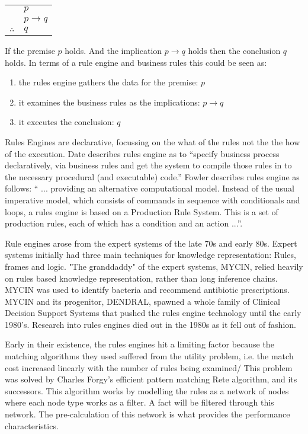 \begin{tabular}{c@{\,}l@{}} 
    & $p$ \\
\arrayrulecolor{blue!60!green!70}    & $p \to q$ \\\cline{2-2}
$\therefore$         & $q$ \\
\end{tabular}

If the premise $p$ holds. And the implication $p \to q$ holds then the conclusion $q$ holds. 
In terms of a rule engine and business rules this could be seen as:
\begin{enumerate}
    \item the rules engine gathers the data for the premise: $p$
    \item it examines the business rules as the implications: $p \to q$
    \item it executes the conclusion: $q$
\end{enumerate}


Rules Engines are declarative, focussing on the what of the rules not the the how of the execution.
Date\cite{date2000not} describes rules engine as to ``specify business process declaratively, via business rules and get the system to compile those rules in to the necessary procedural (and executable) code.''
Fowler\cite{Fowler_rulesEngine} describes rules engine as follows: `` ... providing an alternative computational model.
Instead of the usual imperative model, which consists of commands in sequence with conditionals and loops, a rules engine is based on a Production Rule System.
This is a set of production rules, each of which has a condition and an action ...''.

Rule engines arose from the expert systems of the late 70s and early 80s. 
Expert systems initially had three main techniques for knowledge representation: Rules, frames and logic\cite{jackson1986introduction}.  
"The granddaddy" of the expert systems, MYCIN, relied heavily on rules based knowledge representation\cite{shortliffe1974mycin}, rather than long inference chains.
MYCIN was used to identify bacteria and recommend antibiotic prescriptions.
MYCIN and its progenitor, DENDRAL, spawned a whole family of Clinical Decision Support Systems that pushed the rules engine technology until the early 1980's.
Research into rules engines died out in the 1980s as it fell out of fashion.

Early in their existence, the rules engines hit a limiting factor because the matching algorithms they used suffered from the utility problem, i.e. the match cost increased linearly with the number of rules being examined/
This problem was solved by Charles Forgy's efficient pattern matching Rete algorithm\cite{forgy1989rete}, and its successors.
This algorithm works by modelling the rules as a network of nodes where each node type works as a filter. 
A fact will be filtered through this network.
The pre-calculation of this network is what provides the performance characteristics.

